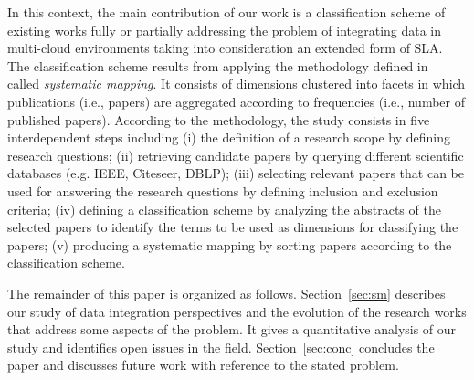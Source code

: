 In this context, the main contribution of our work is
 a classification scheme of existing works fully or partially addressing
the problem of integrating data in multi-cloud environments taking into
consideration an extended form of SLA. 
%
%
The classification scheme results from  applying the  methodology defined
in~\cite{SM:Petersen:2008} called  \textit{systematic mapping}. It consists of dimensions clustered
into facets in which publications (i.e., papers) are aggregated according to
frequencies (i.e., number of published papers). According to the methodology,
the study consists in  five interdependent steps including (i) the definition of
a research scope by defining research questions; (ii) retrieving candidate
papers by querying different scientific databases (e.g. IEEE, Citeseer, DBLP);
(iii) selecting relevant papers that can be used for answering the research
questions by defining inclusion and exclusion criteria; (iv) defining a
classification scheme by analyzing the abstracts of the selected papers to
identify the terms to be used as dimensions for classifying the papers;
(v) producing a systematic mapping by sorting papers according to the
classification scheme.              


The remainder of this paper is organized as follows. Section~\ref{sec:sm}
describes our study of data integration perspectives and the evolution of the
research works that address some aspects of the problem. It gives a quantitative
analysis of our study and identifies open issues in the field.
Section~\ref{sec:conc} concludes the paper and discusses future work with
reference to the stated problem.


